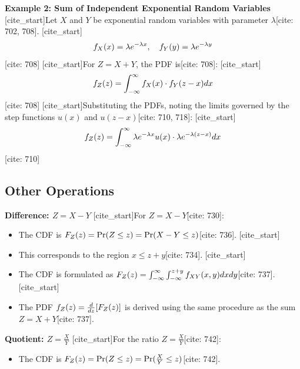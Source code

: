 \documentclass[11pt]{article}
\begin{document}
\textbf{Example 2: Sum of Independent Exponential Random Variables}
[cite_start]Let $X$ and $Y$ be exponential random variables with parameter $\lambda$[cite: 702, 708].
[cite_start]$$f\sb{X}(x) = \lambda e^{-\lambda x}, \quad f\sb{Y}(y) = \lambda e^{-\lambda y}$$ [cite: 708]
[cite_start]For $Z = X + Y$, the PDF is[cite: 708]:
[cite_start]$$f\sb{Z}(z) = \int\sb{-\infty}^{\infty} f\sb{X}(x) \cdot f\sb{Y}(z-x) dx$$ [cite: 708]
[cite_start]Substituting the PDFs, noting the limits governed by the step functions $u(x)$ and $u(z-x)$[cite: 710, 718]:
[cite_start]$$f\sb{Z}(z) = \int\sb{-\infty}^{\infty} \lambda e^{-\lambda x} u(x) \cdot \lambda e^{-\lambda(z-x)} dx$$ [cite: 710]

\subsection{Other Operations}

\textbf{Difference: $Z = X - Y$}
[cite_start]For $Z = X - Y$[cite: 730]:
\begin{itemize}
    [cite_start]\item \leavevmode The CDF is $F\sb{Z}(z) = \Pr(Z \le z) = \Pr(X - Y \le z)$[cite: 736].
    [cite_start]\item \leavevmode This corresponds to the region $x \le z + y$[cite: 734].
    [cite_start]\item \leavevmode The CDF is formulated as $F\sb{Z}(z) = \int\sb{-\infty}^{\infty} \int\sb{-\infty}^{z+y} f\sb{XY}(x,y) dx dy$[cite: 737].
    [cite_start]\item \leavevmode The PDF $f\sb{Z}(z) = \frac{d}{dz}[F\sb{Z}(z)]$ is derived using the same procedure as the sum $Z = X + Y$[cite: 737].
\end{itemize}

\textbf{Quotient: $Z = \frac{X}{Y}$}
[cite_start]For the ratio $Z = \frac{X}{Y}$[cite: 742]:
\begin{itemize}
    [cite_start]\item \leavevmode The CDF is $F\sb{Z}(z) = \Pr(Z \le z) = \Pr(\frac{X}{Y} \le z)$[cite: 742].
\end{itemize}
\end{document}

